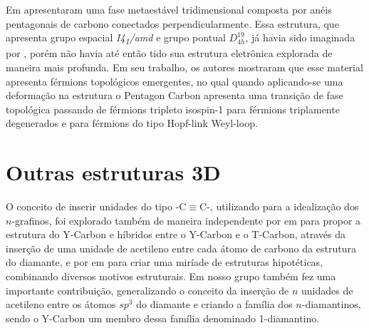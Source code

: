 		
		Em \citeyear{zhong2017three} \citeauthor{zhong2017three}  apresentaram uma fase metaestável tridimensional composta por anéis pentagonais de carbono conectados perpendicularmente. Essa estrutura, que apresenta grupo espacial \textit{I4\textsubscript{1}/amd} e grupo pontual $D^{19}_{4h}$, já havia sido imaginada por \citeauthor{balaban1989carbon}, porém não havia até então tido sua estrutura eletrônica explorada de maneira mais profunda. Em seu trabalho, os autores mostraram que esse material apresenta férmions topológicos emergentes, no qual quando aplicando-se uma deformação na estrutura o Pentagon Carbon apresenta uma transição de fase topológica passando de férmions tripleto isospin-1 para férmions triplamente degenerados e para férmions do tipo Hopf-link Weyl-loop.
	
	\section{Outras estruturas 3D}
	
		O conceito de inserir unidades do tipo -C$\equiv$C-, utilizando para a idealização dos $n$-grafinos, foi explorado também de maneira independente por \citeauthor{jo2012carbon} em \citeyear{jo2012carbon} para propor a estrutura do Y-Carbon e híbridos entre o Y-Carbon e o T-Carbon, através da inserção de uma unidade de acetileno entre cada átomo de carbono da estrutura do diamante, e por \citeauthor{balaban2013expanded} em \citeyear{balaban2013expanded} para criar uma miríade de estruturas hipotéticas, combinando diversos motivos estruturais. Em \citeyear{costa2018n} nosso grupo também fez uma importante contribuição, generalizando o conceito da inserção de $n$ unidades de acetileno entre os átomos $sp^3$ do diamante e criando a família dos $n$-diamantinos\cite{costa2018n}, sendo o Y-Carbon um membro dessa família denominado 1-diamantino. 
	

	
	
	


